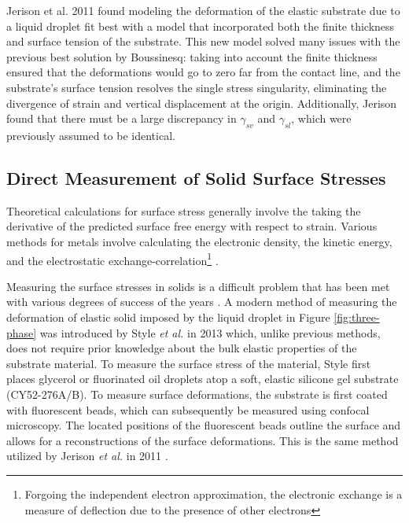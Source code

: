 Jerison et al. 2011 \cite{jerison2011deformation} found modeling the deformation of the elastic substrate due to a liquid droplet fit best with a model that incorporated both the finite thickness and surface tension of the substrate. This new model solved many issues with the previous best solution by Boussinesq: taking into account the finite thickness ensured that the deformations would go to zero far from the contact line, and the substrate's surface tension resolves the single stress singularity, eliminating the divergence of strain and vertical displacement at the origin. Additionally, Jerison found that there must be a large discrepancy in $\gamma_{sv}$ and $\gamma_{sl}$, which were previously assumed to be identical.

\subsection{Direct Measurement of Solid Surface Stresses}
Theoretical calculations for surface stress generally involve the taking the derivative of the predicted surface free energy with respect to strain. Various methods for metals involve calculating the electronic density, the kinetic energy, and the electrostatic exchange-correlation\footnote{Forgoing the independent electron approximation, the electronic exchange is a measure of deflection due to the presence of other electrons} \cite{GURTIN1978431}. 



Measuring the surface stresses in solids is a difficult problem that has been met with various degrees of success of the years . A modern method of measuring the deformation of elastic solid imposed by the liquid droplet in Figure \ref{fig:three-phase} was introduced by Style \emph{et al.} in 2013 \cite{style2013universal} which, unlike previous methods, does not require prior knowledge about the bulk elastic properties of the substrate material. To measure the surface stress of the material, Style first places glycerol or fluorinated oil droplets atop a soft, elastic silicone gel substrate (CY52-276A/B). To measure surface deformations, the substrate is first coated with fluorescent beads, which can subsequently be measured using confocal microscopy. The located positions of the fluorescent beads outline the surface and allows for a reconstructions of the surface deformations. This is the same method utilized by Jerison \emph{et al.} in 2011  \cite{jerison2011deformation}.







